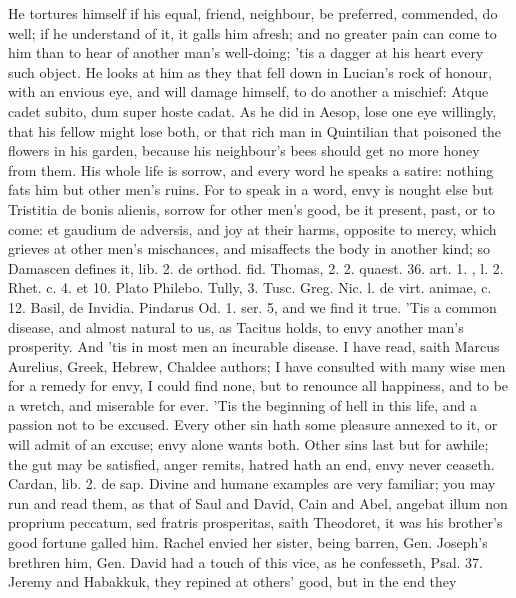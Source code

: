 {He tortures himself if his equal, friend, neighbour, be preferred,
commended, do well; if he understand of it, it galls him afresh; and no
greater pain can come to him than to hear of another man's well-doing;
'tis a dagger at his heart every such object. He looks at him as they
that fell down in Lucian's rock of honour, with an envious eye, and
will damage himself, to do another a mischief: Atque cadet subito, dum
super hoste cadat. As he did in Aesop, lose one eye willingly, that his
fellow might lose both, or that rich man in Quintilian that
poisoned the flowers in his garden, because his neighbour's bees should
get no more honey from them. His whole life is sorrow, and every word
he speaks a satire: nothing fats him but other men's ruins. For to
speak in a word, envy is nought else but Tristitia de bonis alienis,
sorrow for other men's good, be it present, past, or to come: et
gaudium de adversis, and joy at their harms, opposite to mercy,
which grieves at other men's mischances, and misaffects the body
in another kind; so Damascen defines it, lib. 2. de orthod. fid.
Thomas, 2. 2. quaest. 36. art. 1. \Aristotle, l. 2. Rhet. c. 4. et 10.
Plato Philebo. Tully, 3. Tusc. Greg. Nic. l. de virt. animae, c. 12.
Basil, de Invidia. Pindarus Od. 1. ser. 5, and we find it true. 'Tis a
common disease, and almost natural to us, as Tacitus holds, to
envy another man's prosperity. And 'tis in most men an incurable
disease. I have read, saith Marcus Aurelius, Greek, Hebrew,
Chaldee authors; I have consulted with many wise men for a remedy for
envy, I could find none, but to renounce all happiness, and to be a
wretch, and miserable for ever. 'Tis the beginning of hell in this
life, and a passion not to be excused. Every other sin hath some
pleasure annexed to it, or will admit of an excuse; envy alone wants
both. Other sins last but for awhile; the gut may be satisfied, anger
remits, hatred hath an end, envy never ceaseth. Cardan, lib. 2. de sap.
Divine and humane examples are very familiar; you may run and read
them, as that of Saul and David, Cain and Abel, angebat illum non
proprium peccatum, sed fratris prosperitas, saith Theodoret, it was his
brother's good fortune galled him. Rachel envied her sister, being
barren, Gen.  Joseph's brethren him, Gen.  David had a touch
of this vice, as he confesseth, Psal. 37. Jeremy and
Habakkuk, they repined at others' good, but in the end they
}
